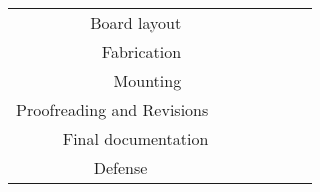 \begin{table}[htp]
\begin{tabular}{rrrrrrrrr}
    \multicolumn{2}{r}{Board layout} &   &   &   &   &   &   &  \\
    \multicolumn{2}{r}{Fabrication} &   &   &   &   &   &   &  \\
    \multicolumn{2}{r}{Mounting} &   &   &   &   &   &   &  \\
    \multicolumn{3}{r}{Proofreading and Revisions} &   &   &   &   &   &  \\
    \multicolumn{3}{r}{Final documentation} &   &   &   &   &   &  \\
    Defense &   &   &   &   &   &   &   &  \\
    \bottomrule
    \end{tabular}%
  \label{tab:addlabel}%
\end{table}%




